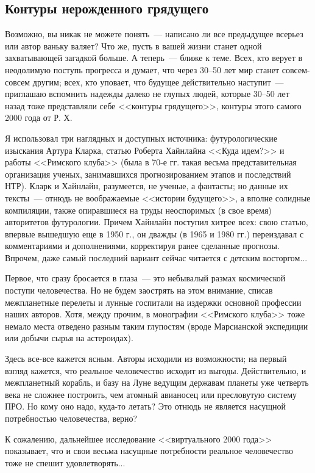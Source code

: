 \documentclass{scrbook}
\newcommand{\flqq}{<<}
\newcommand{\frqq}{>>}
\newcommand{\mdash}{~--- }
\newcommand{\ndash}{--}
\newcommand{\essaysection}[1]{\subsection*{#1}\nopagebreak}
\begin{document}
\essaysection{Контуры нерожденного грядущего}

Возможно, вы никак не можете понять{\mdash}написано ли все предыдущее всерьез или автор ваньку валяет? Что же, пусть в вашей жизни станет одной захватывающей загадкой больше. А теперь{\mdash}ближе к теме. Всех, кто верует в неодолимую поступь прогресса и думает, что через 30{\ndash}50 лет мир станет совсем-совсем другим; всех, кто уповает, что будущее действительно наступит{\mdash}приглашаю вспомнить надежды далеко не глупых людей, которые 30{\ndash}50 лет назад тоже представляли себе {\flqq}контуры грядущего{\frqq}, контуры этого самого 2000 года от Р. Х.

Я использовал три наглядных и доступных источника: футурологические изыскания Артура Кларка, статью Роберта Хайнлайна {\flqq}Куда идем?{\frqq} и работы {\flqq}Римского клуба{\frqq} (была в 70-е гг. такая весьма представительная организация ученых, занимавшихся прогнозированием этапов и последствий НТР). Кларк и Хайнлайн, разумеется, не ученые, а фантасты; но данные их тексты{\mdash}отнюдь не воображаемые {\flqq}истории будущего{\frqq}, а вполне солидные компиляции, также опиравшиеся на труды неоспоримых (в свое время) авторитетов футурологии. Причем Хайнлайн поступил хитрее всех: свою статью, впервые вышедшую еще в 1950 г., он дважды (в 1965 и 1980 гг.) переиздавал с комментариями и дополнениями, корректируя ранее сделанные прогнозы. Впрочем, даже самый последний вариант сейчас читается с детским восторгом...

Первое, что сразу бросается в глаза{\mdash}это небывалый размах космической поступи человечества. Но не будем заострять на этом внимание, списав межпланетные перелеты и лунные госпитали на издержки основной профессии наших авторов. Хотя, между прочим, в монографии {\flqq}Римского клуба{\frqq} тоже немало места отведено разным таким глупостям (вроде Марсианской экспедиции или добычи сырья на астероидах).

Здесь все-все кажется ясным. Авторы исходили из возможности; на первый взгляд кажется, что реальное человечество исходит из выгоды. Действительно, и межпланетный корабль, и базу на Луне ведущим державам планеты уже четверть века не сложнее построить, чем атомный авианосец или пресловутую систему ПРО. Но кому оно надо, куда-то летать? Это отнюдь не является насущной потребностью человечества, верно?

К сожалению, дальнейшее исследование {\flqq}виртуального 2000 года{\frqq} показывает, что и свои весьма насущные потребности реальное человечество тоже не спешит удовлетворять...
\end{document}
